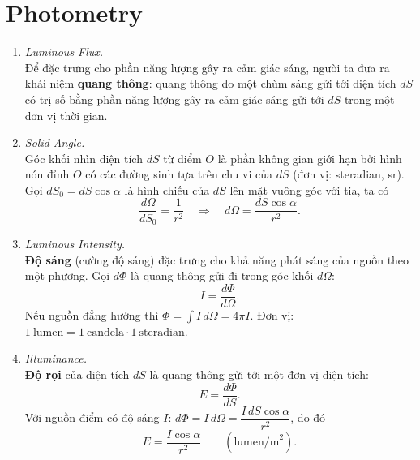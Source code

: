 \section{Photometry}
\begin{enumerate}
\item \textit{Luminous Flux.}\\
Để đặc trưng cho phần năng lượng gây ra cảm giác sáng, người ta đưa ra khái niệm \textbf{quang thông}: quang thông do một chùm sáng gửi tới diện tích $dS$ có trị số bằng phần năng lượng gây ra cảm giác sáng gửi tới $dS$ trong một đơn vị thời gian.

\item \textit{Solid Angle.}\\
Góc khối nhìn diện tích $dS$ từ điểm $O$ là phần không gian giới hạn bởi hình nón đỉnh $O$ có các đường sinh tựa trên chu vi của $dS$ (đơn vị: steradian, sr).
Gọi $dS_0 = dS\cos\alpha$ là hình chiếu của $dS$ lên mặt vuông góc với tia, ta có
\[
\frac{d\Omega}{dS_0} = \frac{1}{r^2}
\quad\Rightarrow\quad
d\Omega = \frac{dS\cos\alpha}{r^2}.
\]

\item \textit{Luminous Intensity.}\\
\textbf{Độ sáng} (cường độ sáng) đặc trưng cho khả năng phát sáng của nguồn theo một phương. Gọi $d\Phi$ là quang thông gửi đi trong góc khối $d\Omega$:
\[
I = \frac{d\Phi}{d\Omega}.
\]
Nếu nguồn đẳng hướng thì $\Phi = \int I\,d\Omega = 4\pi I$. Đơn vị: $1\ \text{lumen} = 1\ \text{candela} \cdot 1\ \text{steradian}$.

\item \textit{Illuminance.}\\
\textbf{Độ rọi} của diện tích $dS$ là quang thông gửi tới một đơn vị diện tích:
\[
E = \frac{d\Phi}{dS}.
\]
Với nguồn điểm có độ sáng $I$: $d\Phi = I\,d\Omega = \dfrac{I\,dS\cos\alpha}{r^2}$, do đó
\[
E = \frac{I\cos\alpha}{r^2} \qquad (\text{lumen/m}^2).
\]
\end{enumerate}

